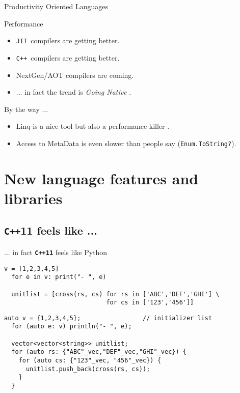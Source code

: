 \documentclass[svgnames,smaller]{beamer}
\newcommand*{\cpp}{\texttt{C++}}
\newcommand*{\jit}{\texttt{JIT}}
\begin{document}
\begin{frame}[fragile]{Productivity Oriented Languages}
  \begin{block}{Performance}
    \begin{itemize}
    \item \jit\ compilers are getting better.
    \item \cpp\ compilers are getting better.
    \item NextGen/AOT compilers are coming.
    \item ... in fact the trend is \textit{Going Native} \cite{Ms-going-native}.
    \end{itemize}
  \end{block}

  \begin{alertblock}{By the way ...}
    \begin{itemize}
    \item Linq is a nice tool but also a performance killer \footnotemark .
    \item Access to MetaData is even slower than people say (\texttt{Enum.ToString?}).
    \end{itemize}
  \end{alertblock}
\end{frame}

\section{New  language features and libraries}

\subsection{\cpp11 feels like ...}

\begin{frame}[fragile]{... in fact \textbf{\texttt{C++11}} feels like Python}
  \begin{lstlisting}[title={python3}]
  v = [1,2,3,4,5]
  for e in v: print("- ", e)

  unitlist = [cross(rs, cs) for rs in ['ABC','DEF','GHI'] \ 
                            for cs in ['123','456']]

  \end{lstlisting}
  \begin{lstlisting}[title={\cpp11}]
  auto v = {1,2,3,4,5};                 // initializer list
  for (auto e: v) println("- ", e);

  vector<vector<string>> unitlist;
  for (auto rs: {"ABC"_vec,"DEF"_vec,"GHI"_vec}) {
    for (auto cs: {"123"_vec, "456"_vec}) {
      unitlist.push_back(cross(rs, cs));
    }
  }
  \end{lstlisting}
\end{frame}
\end{document}
